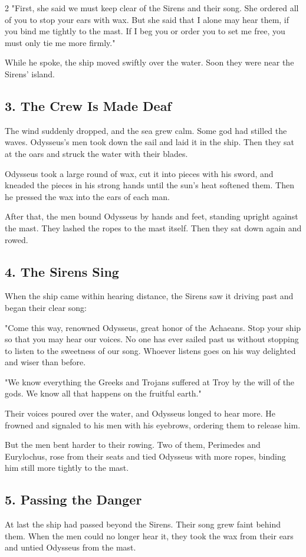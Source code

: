 \documentclass[12pt]{article}
\begin{document}
\begin{multicols}{2}
"First, she said we must keep clear of the Sirens and their song. She ordered all of you to stop your ears with wax. But she said that I alone may hear them, if you bind me tightly to the mast. If I beg you or order you to set me free, you must only tie me more firmly."

While he spoke, the ship moved swiftly over the water. Soon they were near the Sirens' island.

\subsection*{3. The Crew Is Made Deaf}
The wind suddenly dropped, and the sea grew calm. Some god had stilled the waves. Odysseus's men took down the sail and laid it in the ship. Then they sat at the oars and struck the water with their blades.

Odysseus took a large round of wax, cut it into pieces with his sword, and kneaded the pieces in his strong hands until the sun's heat softened them. Then he pressed the wax into the ears of each man.

After that, the men bound Odysseus by hands and feet, standing upright against the mast. They lashed the ropes to the mast itself. Then they sat down again and rowed.

\subsection*{4. The Sirens Sing}
When the ship came within hearing distance, the Sirens saw it driving past and began their clear song:

"Come this way, renowned Odysseus, great honor of the Achaeans. Stop your ship so that you may hear our voices. No one has ever sailed past us without stopping to listen to the sweetness of our song. Whoever listens goes on his way delighted and wiser than before.

"We know everything the Greeks and Trojans suffered at Troy by the will of the gods. We know all that happens on the fruitful earth."

Their voices poured over the water, and Odysseus longed to hear more. He frowned and signaled to his men with his eyebrows, ordering them to release him.

But the men bent harder to their rowing. Two of them, Perimedes and Eurylochus, rose from their seats and tied Odysseus with more ropes, binding him still more tightly to the mast.

\subsection*{5. Passing the Danger}
At last the ship had passed beyond the Sirens. Their song grew faint behind them. When the men could no longer hear it, they took the wax from their ears and untied Odysseus from the mast.


\end{multicols}
\end{document}
